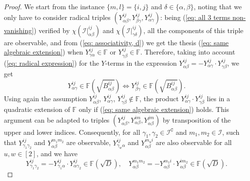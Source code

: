 \documentclass[10pt,a4paper]{amsart}
\begin{document}
\begin{proof}
We start from the instance $\{m,l\}=\{i,j\}$ and $\delta\in\{\alpha,\beta\}$, noting that we only have to consider radical triples $(Y_{\alpha\beta}^{ij},Y_{\beta\gamma}^{ij},Y_{\alpha\gamma}^{ij})$: being (\ref{eq: all 3 terms non-vanishing}) verified by $\chi(\mathcal{I}|_{\alpha\beta}^{ij})$ and $\chi(\mathcal{I}|_{\gamma\delta}^{ij})$, all the components of this triple are observable, and from (\ref{eq: associativity, d}) we get the thesis (\ref{eq: same algebraic extension}) when $Y_{\gamma\alpha}^{ij}\in\mathbb{F}$ or $Y_{\gamma\beta}^{ij}\in\mathbb{F}$. Therefore, taking into account (\ref{eq: radical expression}) for 
the $Y$-terms in the expression $Y_{\alpha\beta}^{ij}=-Y_{\alpha\gamma}^{ij}\cdot Y_{\gamma\beta}^{ij}$, we get  
 \begin{equation}
Y_{\alpha\gamma}^{ij}\in\mathbb{F}(\sqrt{B_{\alpha\beta}^{ij}})\Leftrightarrow Y_{\beta\gamma}^{ij}\in\mathbb{F}(\sqrt{B_{\alpha\beta}^{ij}}).
\label{eq: conditionals same extension}
 \end{equation}
Using again the assumption $Y_{\alpha\beta}^{ij}$, $Y_{\alpha\gamma}^{ij}$, $Y_{\gamma\beta}^{ij}\notin\mathbb{F}$, the product $Y_{\alpha\gamma}^{ij}\cdot Y_{\gamma\beta}^{ij}$ lies in a quadratic extension of $\mathbb{F}$ only if (\ref{eq: same algebraic extension}) holds. 
This argument can be adapted to triples $(Y_{\alpha\beta}^{ij},Y_{\alpha\beta}^{im},Y_{\alpha\beta}^{jm})$ by transposition of the upper and lower indices. Consequently, for all $\gamma_{1},\gamma_{2}\in\mathcal{I}^{\mathtt{C}}$ and $m_{1},m_{2}\in\mathcal{I}$, such that $Y_{\gamma_{1}\gamma_{2}}^{ij}$ and $Y_{\alpha\beta}^{m_{1}m_{2}}$ are observable, $Y_{\gamma_{w}\alpha}^{ij}$ and $Y_{\alpha\beta}^{m_{u}i}$ are also observable for all $u,w\in[2]$, and we have 
\begin{equation}
    Y_{\gamma_{1}\gamma_{2}}^{ij}=-Y_{\gamma_{1}\alpha}^{ij}\cdot Y_{\alpha\gamma_{2}}^{ij}\in \mathbb{F}(\sqrt{D}),\quad  Y_{\alpha\beta}^{m_{1}m_{2}}=-Y_{\alpha\beta}^{m_{1}i}\cdot Y_{\alpha\beta}^{im_{2}}\in \mathbb{F}(\sqrt{D}).
\label{eq: same quadratic extension, only upper or lower}
\end{equation}


\end{proof}
\end{document}
